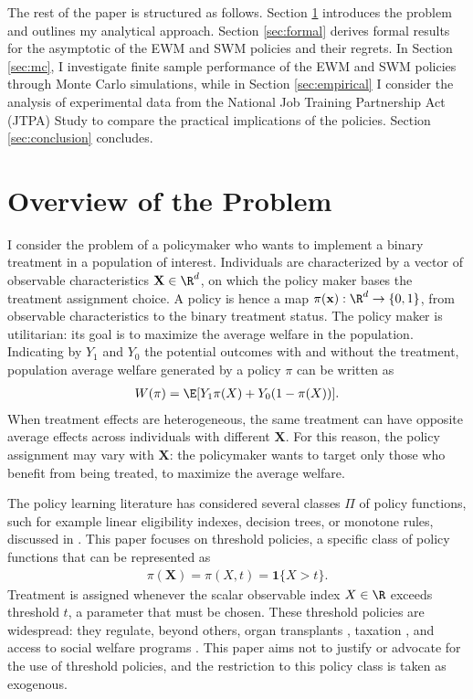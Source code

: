 {The rest of the paper is structured as follows. Section \ref{sec:overview} introduces the problem and outlines my analytical approach. Section \ref{sec:formal} derives formal results for the asymptotic of the EWM and SWM policies and their regrets. In Section \ref{sec:mc}, I investigate finite sample performance of the EWM and SWM policies through Monte Carlo simulations, while in Section \ref{sec:empirical} I consider the analysis of experimental data from the National Job Training Partnership Act (JTPA) Study to compare the practical implications of the policies. Section \ref{sec:conclusion} concludes.

\section{Overview of the Problem} \label{sec:overview}

I consider the problem of a policymaker who wants to implement a binary treatment in a population of interest. Individuals are characterized by a vector of observable characteristics $\textbf{X} \in \R^d$, on which the policy maker bases the treatment assignment choice. A policy is hence a map $\pi(\textbf{x}): \R^d \rightarrow \{0,1\}$, from observable characteristics to the binary treatment status. The policy maker is utilitarian: its goal is to maximize the average welfare in the population. Indicating by $Y_1$ and $Y_0$ the potential outcomes with and without the treatment, population average welfare generated by a policy $\pi$ can be written as
\begin{gather}
    W(\pi) =  \E[Y_1 \pi(X) + Y_0 (1 - \pi(X) )].
\end{gather}
When treatment effects are heterogeneous, the same treatment can have opposite average effects across individuals with different $\textbf{X}$. For this reason, the policy assignment may vary with $\textbf{X}$: the policymaker wants to target only those who benefit from being treated, to maximize the average welfare.

The policy learning literature has considered several classes $\Pi$ of policy functions, such for example linear eligibility indexes, decision trees, or monotone rules, discussed in \cite{kitagawa2018should,athey2021policy, mbakop2021model}. This paper focuses on threshold policies, a specific class of policy functions that can be represented as
\begin{gather}
    \pi(\textbf{X}) = \pi(X,t) = \mathbf{1} \{X > t \}.
\end{gather}
Treatment is assigned whenever the scalar observable index $X \in \R$ exceeds threshold $t$, a parameter that must be chosen. These threshold policies are widespread: they regulate, beyond others, organ transplants \cite{kamath2007model}, taxation \citep{taylor2003corporation}, and access to social welfare programs \citep{ card2008impact,crost2014aid}. This paper aims not to justify or advocate for the use of threshold policies, and the restriction to this policy class is taken as exogenous.

}
